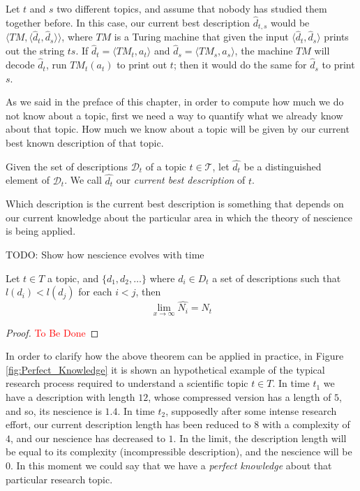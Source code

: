 \begin{example}
\label{ex:unknown_join}
Let $t$ and $s$ two different topics, and assume that nobody has studied them together before. In this case, our current best description $\hat{d}_{t, s}$ would be $\langle TM, \langle \hat{d}_t, \hat{d}_s \rangle \rangle$, where $TM$ is a Turing machine that given the input $\langle \hat{d}_t, \hat{d}_s \rangle$ prints out the string $ts$. If $\hat{d}_t = \langle TM_t, a_t \rangle$ and $\hat{d}_s = \langle TM_s, a_s \rangle$, the machine $TM$ will decode $\hat{d}_t$, run $TM_t(a_t)$ to print out $t$; then it would do the same for $\hat{d}_s$ to print $s$.
\end{example}

As we said in the preface of this chapter, in order to compute how much we do not know about a topic, first we need a way to quantify what we already know about that topic. How much we know about a topic will be given by our current best known description of that topic.

\begin{definition}
Given the set of descriptions $\mathcal{D}_t$ of a topic $t \in \mathcal{T}$, let $\hat{d_{t}}$ be a distinguished element of $\mathcal{D}_t$. We call $\hat{d_{t}}$ our \emph{current best description} of $t$.
\end{definition}

Which description is the current best description is something that depends on our current knowledge about the particular area in which the theory of nescience is being applied.

{\color{red} TODO: Show how nescience evolves with time}

\begin{theorem}
Let $t\in T$ a topic, and $\{d_1, d_2, \ldots \}$ where $d_i \in D_t$ a set of descriptions such that $ l(d_i) < l(d_j)$ for each $i < j$, then
\[
\lim_{x \to \infty} \hat{N_i} = N_t
\]
\end{theorem}
\begin{proof}
\textcolor{red}{To Be Done}
\end{proof}

\begin{example}
In order to clarify how the above theorem can be applied in practice, in Figure \ref{fig:Perfect_Knowledge} it is shown an hypothetical example of the typical research process required to understand a scientific topic $t\in T$. In time $t_{1}$ we have a description with length $12$, whose compressed version has a length of $5$, and so, its nescience is $1.4$. In time $t_{2}$, supposedly after some intense research effort, our current description length has been reduced to $8$ with a complexity of $4$, and our nescience has decreased to $1$. In the limit, the description length will be equal to its complexity (incompressible description), and the nescience will be 0. In this moment we could say that we have a \emph{perfect knowledge} about that particular research topic.
\end{example}

